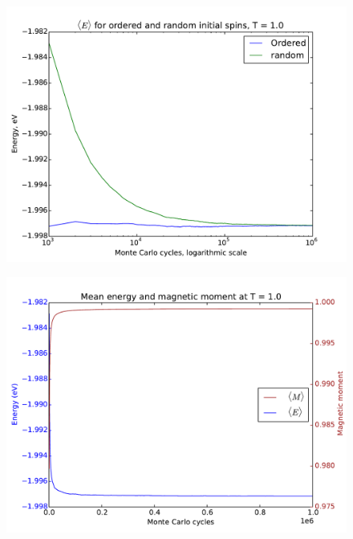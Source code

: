 




\begin{figure}[H]
	\centering
	\includegraphics[width=1\linewidth]{../results/4c/ran_order_T1}
	\caption{}
	\label{fig:ranordert1}
\end{figure}



	\begin{figure}[H]

		\includegraphics[width=1\linewidth]{../results/4c/En_mag_T1.0}
		\caption{}
		\label{fig:enmagt1}
	\end{figure}
	
